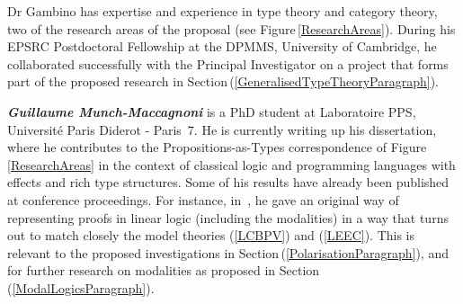\documentclass[11pt,twocolumn]{article}
\newcommand{\pref}[1]{\,(\ref{#1})}
\newcommand{\eg}{\emph{eg.}}
\newcommand{\SystemL}{\mbox{System~$L$}}
\begin{document}
Dr Gambino has expertise and experience in type theory and category theory,
two of the research areas of the proposal (see Figure\,\ref{ResearchAreas}). 
During his EPSRC Postdoctoral Fellowship at the DPMMS, University of
Cambridge, he collaborated successfully with the Principal Investigator on a
project that forms part of the proposed research in
Section\pref{GeneralisedTypeTheoryParagraph}.

\smallskip\noindent
\textbf{\em Guillaume Munch-Maccagnoni} 
%
%
is a PhD student at Laboratoire PPS, Universit\'e Paris Diderot - Paris~7.
He is currently writing up his dissertation, where he contributes to the
Propositions-as-Types correspondence of Figure\,\ref{ResearchAreas} in the
context of classical logic and programming languages with effects and rich
type structures.  Some of his results have already been published at
conference proceedings. %
For instance, 
%
%
in~\cite{Munch}, 
he gave an original way of representing proofs in linear logic (including the
modalities) in a way that turns out to match closely the model theories
(\ref{LCBPV}) and (\ref{LEEC}).  This is relevant to the proposed
investigations in Section\mbox{\pref{PolarisationParagraph}}, and for further
research on modalities as proposed in Section\pref{ModalLogicsParagraph}.
%
\end{document}

